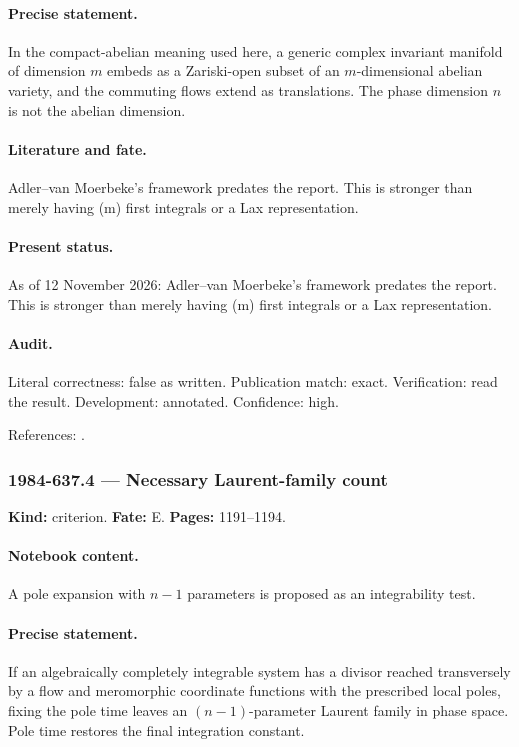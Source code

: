 \paragraph{Precise statement.} In the compact-abelian meaning used here, a generic complex invariant manifold of dimension \(m\) embeds as a Zariski-open subset of an \(m\)-dimensional abelian variety, and the commuting flows extend as translations. The phase dimension \(n\) is not the abelian dimension.

\paragraph{Literature and fate.} Adler--van Moerbeke's framework predates the report. This is stronger than merely having (m) first integrals or a Lax representation.

\paragraph{Present status.} As of 12 November 2026: Adler--van Moerbeke's framework predates the report. This is stronger than merely having (m) first integrals or a Lax representation.

\paragraph{Audit.} Literal correctness: false as written. Publication match: exact. Verification: read the result. Development: annotated. Confidence: high.

\noindent References: \citep{adler1982kowalewski}.\par

\subsubsection{1984-637.4 --- Necessary Laurent-family count}

\label{item:1984-637.4}

\noindent\textbf{Kind:} criterion. \textbf{Fate:} E. \textbf{Pages:} 1191--1194.\par

\paragraph{Notebook content.} A pole expansion with \(n-1\) parameters is proposed as an integrability test.

\paragraph{Precise statement.} If an algebraically completely integrable system has a divisor reached transversely by a flow and meromorphic coordinate functions with the prescribed local poles, fixing the pole time leaves an \((n-1)\)-parameter Laurent family in phase space. Pole time restores the final integration constant.

